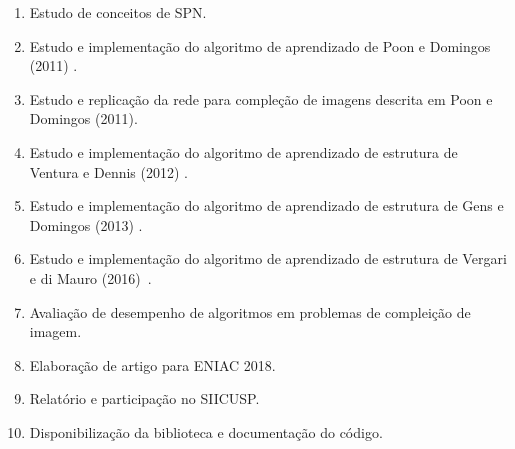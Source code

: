 \documentclass[12pt]{article}
\theoremstyle{plain}
\numberwithin{equation}{section}
\begin{document}
\begin{enumerate}[label=\alph*.]
  \item Estudo de conceitos de SPN\@.
  \item Estudo e implementação do algoritmo de aprendizado de Poon e Domingos (2011)
    \cite{poon-domingos}.
  \item Estudo e replicação da rede para compleção de imagens descrita em Poon e Domingos (2011).
  \item Estudo e implementação do algoritmo de aprendizado de estrutura de Ventura e Dennis (2012)
    \cite{clustering}.
  \item Estudo e implementação do algoritmo de aprendizado de estrutura de Gens e Domingos (2013)
    \cite{gens-domingos}.
  \item Estudo e implementação do algoritmo de aprendizado de estrutura de Vergari e di Mauro
    (2016)~\cite{vergari-mauro}.
  \item Avaliação de desempenho de algoritmos em problemas de compleição de imagem.
  \item Elaboração de artigo para ENIAC 2018.
  \item Relatório e participação no SIICUSP\@.
  \item Disponibilização da biblioteca e documentação do código.
\end{enumerate}

\printbibliography[]
\end{document}
